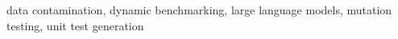 \documentclass[conference,letterpaper]{IEEEtran}
\makeatletter
\def\@IEEENORMtitlevspace{0pt}
\makeatother
\begin{document}
\begin{abstract}

\end{abstract}

\begin{IEEEkeywords}
data contamination, dynamic benchmarking, large language models, mutation testing, unit test generation
\end{IEEEkeywords}









\IEEEtriggercmd{\enlargethispage{2\baselineskip}}


\end{document}
